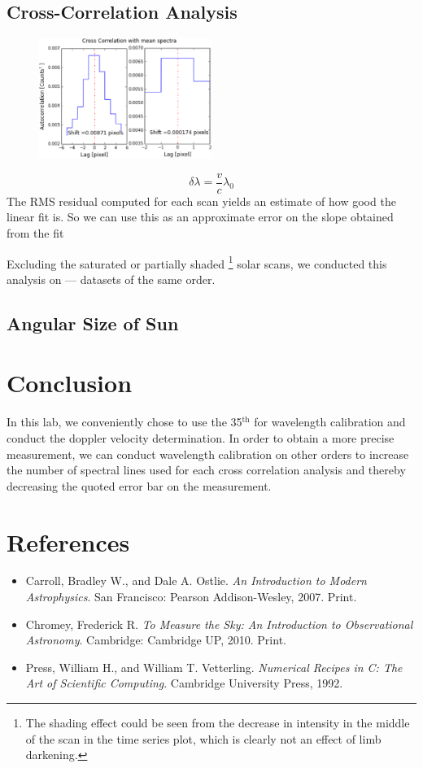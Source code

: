 \documentclass[authoryear, 12pt,5p, times]{elsarticle}
\begin{document}
\subsection{Cross-Correlation Analysis}
\begin{figure}[h!]
\includegraphics[width=0.5\textwidth]{figures/autocorr_curve}
\caption{}
\label{autocorr_curve}
\end{figure}
\begin{equation}
\delta\lambda=\frac{v}{c}\lambda_0
\label{doppler_eq}
\end{equation}
The RMS residual  computed for each scan yields an estimate of how good the linear fit is. So we can use this as an approximate error on the slope obtained from the fit

Excluding the saturated or partially shaded \footnote{The shading effect could be seen from the decrease in intensity in the middle of the scan in the time series plot, which is clearly not an effect of limb darkening.} solar scans, we conducted this analysis on --- datasets of the same order. 
\subsection{Angular Size of Sun}
\label{size_calc}
\section{Conclusion}
In this lab, we conveniently chose to use the 35$^\text{th}$ for wavelength calibration and conduct the doppler velocity determination. In order to obtain a more precise measurement, we can conduct wavelength calibration on other orders to increase the number of spectral lines used for each cross correlation analysis and thereby decreasing the quoted error bar on the measurement.
 \section*{References}
 \begin{footnotesize}
 \begin{itemize}
 \item Carroll, Bradley W., and Dale A. Ostlie. \textit{An Introduction to Modern Astrophysics}. San Francisco: Pearson Addison-Wesley, 2007. Print.
\item Chromey, Frederick R. \textit{To Measure the Sky: An Introduction to Observational Astronomy}. Cambridge: Cambridge UP, 2010. Print.
\item Press, William H., and William T. Vetterling. \textit{Numerical Recipes in C: The Art of Scientific Computing}. Cambridge University Press, 1992.  
\end{itemize}
% 
%
  \end{footnotesize}
\end{document}
